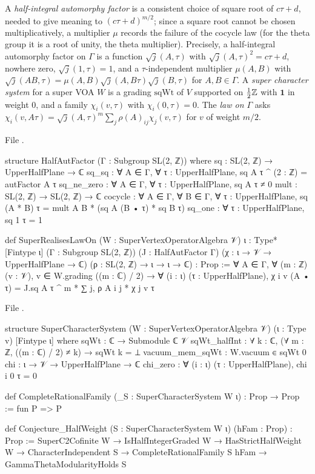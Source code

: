 \begin{definition}\label{l14:def:halfaut}
A \emph{half-integral automorphy factor} is a consistent choice of square root of $c\tau+d$, needed to give meaning to
$(c\tau+d)^{m/2}$; since a square root cannot be chosen multiplicatively, a multiplier $\mu$ records the failure of the cocycle
law (for the theta group it is a root of unity, the theta multiplier). Precisely, a half-integral automorphy factor on $\Gamma$
is a function $\sqrt{j}(A,\tau)$ with $\sqrt j(A,\tau)^2 = c\tau+d$, nowhere
zero, $\sqrt j(1,\tau) = 1$, and a $\tau$-independent multiplier $\mu(A,B)$ with $\sqrt j(AB,\tau) =
\mu(A,B)\sqrt j(A,B\tau)\sqrt j(B,\tau)$ for $A,B\in\Gamma$. A \emph{super character system} for a super VOA $W$ is a grading
$\mathrm{sqWt}$ of $V$ supported on $\frac12{\mathbb{Z}}$ with $\mathbf 1$ in weight $0$, and a family $\chi_i(v,\tau)$ with
$\chi_i(0,\tau) = 0$. The \emph{law on $\Gamma$} asks $\chi_i(v,A\tau) = \sqrt j(A,\tau)^m\sum_j\rho(A)_{ij}\chi_j(v,\tau)$ for
$v$ of weight $m/2$.
\end{definition}
\noindent File .
\begin{leancode}
structure HalfAutFactor (Γ : Subgroup SL(2, ℤ)) where
  sq : SL(2, ℤ) → UpperHalfPlane → ℂ
  sq_sq : ∀ A ∈ Γ, ∀ τ : UpperHalfPlane, sq A τ ^ (2 : ℤ) = autFactor A τ
  sq_ne_zero : ∀ A ∈ Γ, ∀ τ : UpperHalfPlane, sq A τ ≠ 0
  mult : SL(2, ℤ) → SL(2, ℤ) → ℂ
  cocycle : ∀ A ∈ Γ, ∀ B ∈ Γ, ∀ τ : UpperHalfPlane,
    sq (A * B) τ = mult A B * (sq A (B • τ) * sq B τ)
  sq_one : ∀ τ : UpperHalfPlane, sq 1 τ = 1

def SuperRealisesLawOn (W : SuperVertexOperatorAlgebra 𝒱) {ι : Type*} [Fintype ι]
    (Γ : Subgroup SL(2, ℤ)) (J : HalfAutFactor Γ)
    (χ : ι → 𝒱 → UpperHalfPlane → ℂ) (ρ : SL(2, ℤ) → ι → ι → ℂ) : Prop :=
  ∀ A ∈ Γ, ∀ (m : ℤ) (v : 𝒱), v ∈ W.grading ((m : ℂ) / 2) → ∀ (i : ι) (τ : UpperHalfPlane),
    χ i v (A • τ) = J.sq A τ ^ m * ∑ j, ρ A i j * χ j v τ
\end{leancode}
\noindent File .
\begin{leancode}
structure SuperCharacterSystem (W : SuperVertexOperatorAlgebra 𝒱) (ι : Type v) [Fintype ι] where
  sqWt : ℂ → Submodule ℂ 𝒱
  sqWt_halfInt : ∀ k : ℂ, (∀ m : ℤ, ((m : ℂ) / 2) ≠ k) → sqWt k = ⊥
  vacuum_mem_sqWt : W.vacuum ∈ sqWt 0
  chi : ι → 𝒱 → UpperHalfPlane → ℂ
  chi_zero : ∀ (i : ι) (τ : UpperHalfPlane), chi i 0 τ = 0

def CompleteRationalFamily (_S : SuperCharacterSystem W ι) : Prop → Prop := fun P => P

def Conjecture_HalfWeight (S : SuperCharacterSystem W ι) (hFam : Prop) : Prop :=
  SuperC2Cofinite W → IsHalfIntegerGraded W → HasStrictHalfWeight W →
    CharacterIndependent S → CompleteRationalFamily S hFam → GammaThetaModularityHolds S
\end{leancode}
